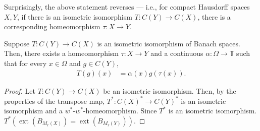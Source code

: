 \documentclass[10pt]{mypackage}
\begin{document}
Surprisingly, the above statement reverses --- i.e., for compact Hausdorff spaces $X,Y$, if there is an isometric isomorphism $T\colon C\left( Y \right)\rightarrow C\left( X \right)$, there is a corresponding homeomorphism $\tau\colon X\rightarrow Y$.
\begin{theorem}
  Suppose $T\colon C\left( Y \right)\rightarrow C\left( X \right)$ is an isometric isomorphism of Banach spaces. Then, there exists a homeomorphism $\tau\colon X\rightarrow Y$ and a continuous $\alpha\colon \Omega\rightarrow \mathbb{T}$ such that for every $x\in\Omega$ and $g\in C\left( Y \right)$,
  \begin{align*}
    T\left( g \right)\left( x \right) &= \alpha(x)g\left( \tau\left( x \right) \right).
  \end{align*}
\end{theorem}
\begin{proof}
  Let $T\colon C\left( Y \right)\rightarrow C\left( X \right)$ be an isometric isomorphism. Then, by the properties of the transpose map, $T^{\ast}\colon C\left( X \right)^{\ast}\rightarrow C\left( Y \right)^{\ast}$ is an isometric isomorphism and a $w^{\ast}$-$w^{\ast}$-homeomorphism. Since $T^{\ast}$ is an isometric isomorphism. $T^{\ast}\left( \operatorname{ext}\left( B_{M_{r}\left( X \right)} \right) = \operatorname{ext}\left( B_{M_{r}\left( Y \right)} \right) \right)$.
\end{proof}
\end{document}
